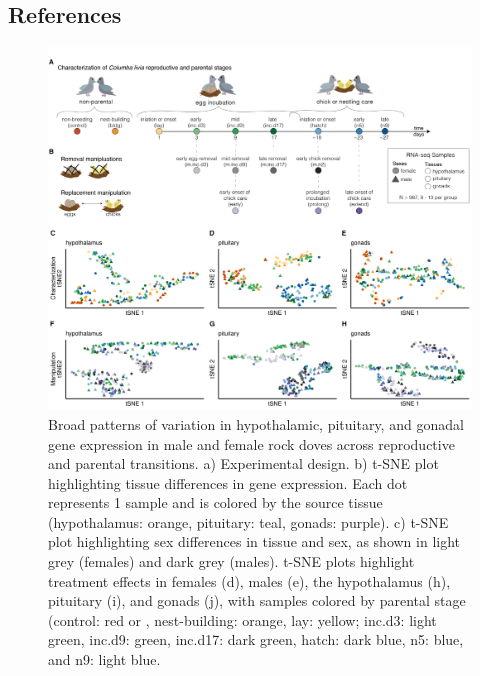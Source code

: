 \hypertarget{references}{%
\subsection{References}\label{references}}



\newpage

\begin{figure}[h]
  \centering
  \includegraphics[width=1.0\textwidth]{../../figures/fig1-1}
  \caption{Broad patterns of variation in hypothalamic, pituitary, and gonadal gene expression in male and female rock doves across reproductive and parental transitions. a) Experimental design. b) t-SNE plot highlighting tissue differences in gene expression. Each dot represents 1 sample and is colored by the source tissue (hypothalamus: orange, pituitary: teal, gonads: purple). c) t-SNE plot highlighting sex differences in tissue and sex, as shown in light grey (females) and dark grey (males). t-SNE plots highlight treatment effects in females (d), males (e), the hypothalamus (h), pituitary (i), and gonads (j), with samples colored by parental stage (control: red or , nest-building: orange, lay: yellow; inc.d3: light green, inc.d9: green, inc.d17: dark green, hatch: dark blue, n5: blue, and n9: light blue.}
  \label{figure:fig1}
\end{figure}

\newpage

